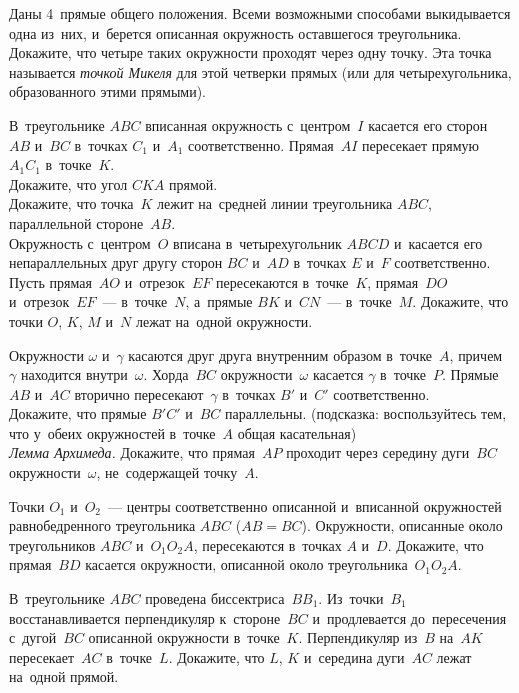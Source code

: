 \begin{problems}
\item
Даны 4~прямые общего положения.
Всеми возможными способами выкидывается одна из~них, и~берется описанная
окружность оставшегося треугольника.
Докажите, что четыре таких окружности проходят через одну точку.
Эта точка называется \emph{точкой Микеля} для этой четверки прямых
(или для четырехугольника, образованного этими прямыми).

\item
В~треугольнике $ABC$ вписанная окружность с~центром~$I$ касается его сторон
$AB$ и~$BC$ в~точках $C_1$ и~$A_1$ соответственно.
Прямая~$AI$ пересекает прямую~$A_1 C_1$ в~точке~$K$.
\\
\subproblem Докажите, что угол $CKA$ прямой.
\\
\subproblem
Докажите, что точка~$K$ лежит на~средней линии треугольника $ABC$,
параллельной стороне~$AB$.
\\
\subproblem
Окружность с~центром~$O$ вписана в~четырехугольник $ABCD$ и~касается его
непараллельных друг другу сторон $BC$ и~$AD$ в~точках $E$ и~$F$ соответственно.
Пусть прямая~$AO$ и~отрезок~$EF$ пересекаются в~точке~$K$,
прямая~$DO$ и~отрезок~$EF$~--- в~точке~$N$,
а~прямые $BK$ и~$CN$~--- в~точке~$M$.
Докажите, что точки $O$, $K$, $M$ и~$N$ лежат на~одной окружности.

\item
Окружности $\omega$ и~$\gamma$ касаются друг друга внутренним образом
в~точке~$A$, причем $\gamma$ находится внутри~$\omega$.
Хорда~$BC$ окружности~$\omega$ касается $\gamma$ в~точке~$P$.
Прямые $AB$ и~$AC$ вторично пересекают~$\gamma$ в~точках $B'$ и~$C'$
соответственно.
\\
\subproblem
Докажите, что прямые $B'C'$ и~$BC$ параллельны.
(подсказка: воспользуйтесь тем, что у~обеих окружностей в~точке~$A$ общая
касательная)
\\
\subproblem\emph{Лемма Архимеда.}
Докажите, что прямая~$AP$ проходит через середину дуги~$BC$
окружности~$\omega$, не~содержащей точку~$A$.

\item
Точки $O_1$ и~$O_2$~--- центры соответственно описанной и~вписанной окружностей
равнобедренного треугольника $ABC$ ($AB = BC$).
Окружности, описанные около треугольников $ABC$ и~$O_1 O_2 A$, пересекаются
в~точках $A$ и~$D$.
Докажите, что прямая~$BD$ касается окружности, описанной около
треугольника~$O_1 O_2 A$.

\item
В~треугольнике $ABC$ проведена биссектриса~$B B_1$.
Из~точки~$B_1$ восстанавливается перпендикуляр к~стороне~$BC$ и~продлевается
до~пересечения с~дугой~$BC$ описанной окружности в~точке~$K$.
Перпендикуляр из~$B$ на~$AK$ пересекает~$AC$ в~точке~$L$.
Докажите, что $L$, $K$ и~середина дуги~$AC$ лежат на~одной прямой.


\end{problems}
